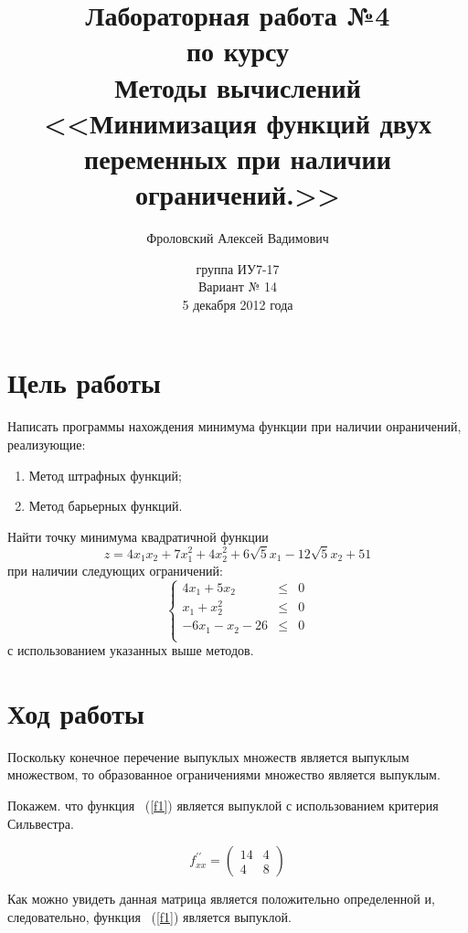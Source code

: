 \documentclass[12pt,a4paper,oneside]{report}
\title{Лабораторная работа №4\\по курсу\\Методы вычислений \\<<Минимизация функций двух переменных при наличии ограничений.>>}
\author{Фроловский Алексей Вадимович}
\date{группа ИУ7-17 \\ Вариант № 14\\5 декабря 2012 года}
\begin{document}
\maketitle
\section*{Цель работы}

Написать программы нахождения минимума функции при наличии онраничений, реализующие:
\begin{enumerate}
\item Метод штрафных функций;
\item Метод барьерных функций.
\end{enumerate}

Найти точку минимума квадратичной функции
\begin{equation}
\label{f1}
z = 4x_{1}x_{2}+7x^{2}_{1}+4x^{2}_{2}+6\sqrt{5}x_{1}-12\sqrt{5}x_{2}+51
\end{equation}
при наличии следующих ограничений:
\begin{equation}
\left\{  
 	\begin{array}{rcl}  
	4x_{1} + 5x_{2} & \leq & 0 \\  
           x_{1} + x^{2}_{2} & \leq & 0 \\  
           -6x_{1} - x_{2} - 26 & \leq & 0 \\  
           \end{array}   
\right.
\end{equation}
с использованием указанных выше методов.

\section*{Ход работы}

Поскольку конечное перечение выпуклых множеств является выпуклым множеством, то образованное ограничениями множество является выпуклым.

Покажем. что функция ~(\ref{f1}) является выпуклой с использованием критерия Сильвестра.

\begin{equation}
f^{\prime\prime}_{xx} =  \left( \begin{array}{cc}
	14 & 4 \\
 	  4 & 8 \end{array} \right)
\end{equation}

Как можно увидеть данная матрица является положительно определенной и, следовательно, функция ~(\ref{f1}) является выпуклой.
\end{document}
